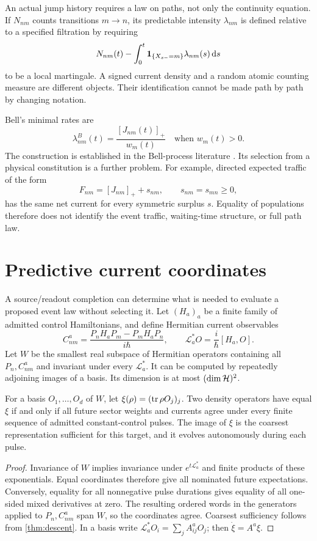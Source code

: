 An actual jump history requires a law on paths, not only the continuity equation. If $N_{nm}$ counts transitions $m\to n$, its predictable intensity $\lambda_{nm}$ is defined relative to a specified filtration by requiring
\[
N_{nm}(t)-\int_0^t\mathbf 1_{\{X_{s-}=m\}}\lambda_{nm}(s)\,\mathrm d s
\]
to be a local martingale. A signed current density and a random atomic counting measure are different objects. Their identification cannot be made path by path by changing notation.

Bell's minimal rates are
\begin{equation}\label{eq:bell}
\lambda^B_{nm}(t)=\frac{[J_{nm}(t)]_+}{w_m(t)}
\quad\text{when }w_m(t)>0.
\end{equation}
The construction is established in the Bell-process literature \cite{Bell1986,Durr2005}. Its selection from a physical constitution is a further problem. For example, directed expected traffic of the form
\[
F_{nm}=[J_{nm}]_++s_{nm},\qquad s_{nm}=s_{mn}\ge0,
\]
has the same net current for every symmetric surplus $s$. Equality of populations therefore does not identify the event traffic, waiting-time structure, or full path law.

\section{Predictive current coordinates}\label{section:quantum:predictive-current-coordinates}
A source/readout completion can determine what is needed to evaluate a proposed event law without selecting it. Let $(H_a)_a$ be a finite family of admitted control Hamiltonians, and define Hermitian current observables
\[
C^a_{nm}=\frac{P_nH_aP_m-P_mH_aP_n}{i\hbar},
\qquad \mathcal L_a^*O=\frac{i}{\hbar}[H_a,O].
\]
Let $W$ be the smallest real subspace of Hermitian operators containing all $P_n,C^a_{nm}$ and invariant under every $\mathcal L_a^*$. It can be computed by repeatedly adjoining images of a basis. Its dimension is at most $(\dim\mathcal H)^2$.

\begin{theorem}\label{thm:current-rep}
For a basis $O_1,\ldots,O_d$ of $W$, let $\xi(\rho)=(\operatorname{tr}\rho O_j)_j$. Two density operators have equal $\xi$ if and only if all future sector weights and currents agree under every finite sequence of admitted constant-control pulses. The image of $\xi$ is the coarsest representation sufficient for this target, and it evolves autonomously during each pulse.
\end{theorem}
\begin{proof}
Invariance of $W$ implies invariance under $e^{t\mathcal L_a^*}$ and finite products of these exponentials. Equal coordinates therefore give all nominated future expectations. Conversely, equality for all nonnegative pulse durations gives equality of all one-sided mixed derivatives at zero. The resulting ordered words in the generators applied to $P_n,C^a_{nm}$ span $W$, so the coordinates agree. Coarsest sufficiency follows from \cref{thm:descent}. In a basis write $\mathcal L_a^*O_i=\sum_jA^a_{ij}O_j$; then $\dot\xi=A^a\xi$.
\end{proof}

